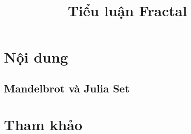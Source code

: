 \documentclass[oneside,final]{report}
\title{\LARGE Tiểu luận Fractal}
\begin{document}
\coverpage%


\tableofcontents
\section{Nội dung}
\subsection{Mandelbrot và Julia Set}
\section{Tham khảo}
\clearpage
\printbibliography
\end{document}
